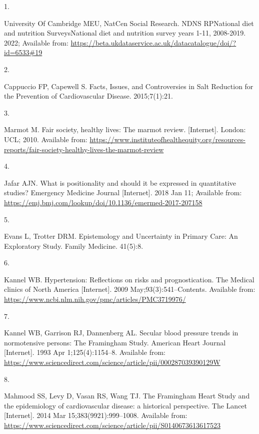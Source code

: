 \documentclass[
]{article}
\newlength{\cslhangindent}
\newlength{\csllabelwidth}
\newlength{\cslentryspacingunit} %
\newenvironment{CSLReferences}[2] %
 {%
  \setlength{\parindent}{0pt}
  \ifodd #1
  \let\oldpar\par
  \def\par{\hangindent=\cslhangindent\oldpar}
  \fi
  \setlength{\parskip}{#2\cslentryspacingunit}
 }%
 {}
\newcommand{\CSLLeftMargin}[1]{\parbox[t]{\csllabelwidth}{#1}}
\newcommand{\CSLRightInline}[1]{\parbox[t]{\linewidth - \csllabelwidth}{#1}\break}
\begin{document}
\hypertarget{refs}{}
\begin{CSLReferences}{0}{0}
\leavevmode{}%
\CSLLeftMargin{1. }%
\CSLRightInline{University Of Cambridge MEU, NatCen Social Research.
NDNS RPNational diet and nutrition SurveysNational diet and nutrition
survey years 1-11, 2008-2019. 2022; Available from:
\url{https://beta.ukdataservice.ac.uk/datacatalogue/doi/?id=6533\#19}}

\leavevmode{}%
\CSLLeftMargin{2. }%
\CSLRightInline{Cappuccio FP, Capewell S. Facts, Issues, and
Controversies in Salt Reduction for the Prevention of Cardiovascular
Disease. 2015;7(1):21. }

\leavevmode{}%
\CSLLeftMargin{3. }%
\CSLRightInline{Marmot M. Fair society, healthy lives: The marmot
review. {[}Internet{]}. London: UCL; 2010. Available from:
\url{https://www.instituteofhealthequity.org/resources-reports/fair-society-healthy-lives-the-marmot-review}}

\leavevmode{}%
\CSLLeftMargin{4. }%
\CSLRightInline{Jafar AJN. What is positionality and should it be
expressed in quantitative studies? Emergency Medicine Journal
{[}Internet{]}. 2018 Jan 11; Available from:
\url{https://emj.bmj.com/lookup/doi/10.1136/emermed-2017-207158}}

\leavevmode{}%
\CSLLeftMargin{5. }%
\CSLRightInline{Evans L, Trotter DRM. Epistemology and Uncertainty in
Primary Care: An Exploratory Study. Family Medicine. 41(5):8. }

\leavevmode{}%
\CSLLeftMargin{6. }%
\CSLRightInline{Kannel WB. Hypertension: Reflections on risks and
prognostication. The Medical clinics of North America {[}Internet{]}.
2009 May;93(3):541--Contents. Available from:
\url{https://www.ncbi.nlm.nih.gov/pmc/articles/PMC3719976/}}

\leavevmode{}%
\CSLLeftMargin{7. }%
\CSLRightInline{Kannel WB, Garrison RJ, Dannenberg AL. Secular blood
pressure trends in normotensive persons: The Framingham Study. American
Heart Journal {[}Internet{]}. 1993 Apr 1;125(4):1154--8. Available from:
\url{https://www.sciencedirect.com/science/article/pii/000287039390129W}}

\leavevmode{}%
\CSLLeftMargin{8. }%
\CSLRightInline{Mahmood SS, Levy D, Vasan RS, Wang TJ. The Framingham
Heart Study and the epidemiology of cardiovascular disease: a historical
perspective. The Lancet {[}Internet{]}. 2014 Mar 15;383(9921):999--1008.
Available from:
\url{https://www.sciencedirect.com/science/article/pii/S0140673613617523}}


\end{CSLReferences}
\end{document}
